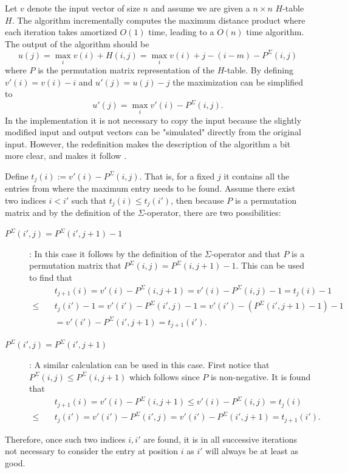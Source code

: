 \documentclass[twoside,11pt,openright]{report}
\begin{document}
Let $v$ denote the input vector of size $n$ and assume we are given a $n \times n$ $H$-table $H$. The algorithm incrementally computes the maximum distance product where each iteration takes amortized $O(1)$ time, leading to a $O(n)$ time algorithm. The output of the algorithm should be
\[
  u(j) = \max_i v(i) + H(i, j) = \max_i v(i) + j - (i - m) - P^{\Sigma}(i, j)
\]
where $P$ is the permutation matrix representation of the $H$-table. By defining $v'(i) = v(i) - i$ and $u'(j) = u(j) - j$ the maximization can be simplified to
\[
  u'(j) = \max_i v'(i) - P^{\Sigma}(i, j).
\]
In the implementation it is not necessary to copy the input because the slightly modified input and output vectors can be "simulated" directly from the original input. However, the redefinition makes the description of the algorithm a bit more clear, and makes it follow \cite[Lemma 2, p. 234]{Gawrychowski:2012:FAC:2422024.2422048}.

Define $t_j(i) := v'(i) - P^{\Sigma}(i, j)$. That is, for a fixed $j$ it contains all the entries from where the maximum entry needs to be found. Assume there exist two indices $i < i'$ such that $t_j(i) \leq t_j(i')$, then because $P$ is a permutation matrix and by the definition of the $\Sigma$-operator, there are two possibilities:
\begin{description}
  \item[$P^{\Sigma}(i', j) = P^{\Sigma}(i', j + 1) - 1$]: In this case it follows by the definition of the $\Sigma$-operator and that $P$ is a permutation matrix that $P^{\Sigma}(i, j) = P^{\Sigma}(i, j + 1) - 1$.  This can be used to find that
  \begin{align*}
    &t_{j + 1}(i) = v'(i) - P^{\Sigma}(i, j + 1) = v'(i) - P^{\Sigma}(i, j) - 1
      = t_{j}(i) - 1 \\
      \leq\quad &t_j(i') - 1 = v'(i') - P^{\Sigma}(i', j) - 1
      = v'(i') - (P^{\Sigma}(i', j + 1) - 1) - 1 \\
      &= v'(i') - P^{\Sigma}(i', j + 1) = t_{j + 1}(i').
  \end{align*}

  \item[$P^{\Sigma}(i', j) = P^{\Sigma}(i', j + 1)$]: A similar calculation can be used in this case. First notice that $P^{\Sigma}(i, j) \leq P^{\Sigma}(i, j + 1)$ which follows since $P$ is non-negative. It is found that
  \begin{align*}
    &t_{j + 1}(i) = v'(i) - P^{\Sigma}(i, j + 1) \leq v'(i) - P^{\Sigma}(i, j) = t_{j}(i) \\
      \leq\quad &t_j(i') = v'(i') - P^{\Sigma}(i', j) = v'(i') - P^{\Sigma}(i', j + 1) = t_{j + 1}(i').
  \end{align*}
\end{description}
%
Therefore, once such two indices $i,i'$ are found, it is in all successive iterations not necessary to consider the entry at position $i$ as $i'$ will always be at least as good.
\end{document}
